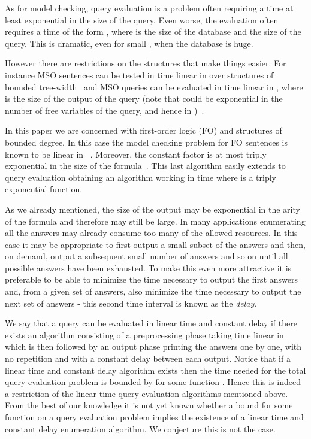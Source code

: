 \documentclass{LMCS}
\begin{document}
As for model checking, query evaluation is a problem often requiring a time at
least exponential in the size of the query. Even worse, the evaluation often
requires a time of the form , where  is the size of the database
and  the size of the query. This is dramatic, even for small , when the
database is huge.

However there are restrictions on the structures that make things easier. For
instance MSO sentences can be tested in time linear in  over structures of
bounded tree-width~\cite{Courcelle90} and MSO queries can be evaluated in time
linear in , where  is the size of the output of the query (note that
 could be exponential in the number of free variables of the query, and
hence in )~\cite{FlumFrickGrohe02}.

In this paper we are concerned with first-order logic (FO) and structures of
bounded degree. In this case the model checking problem for FO sentences is known to be
linear in ~\cite{Seese96}. Moreover, the constant factor is at most triply
exponential in the size  of the formula~\cite{FrickGrohe04}. This last
algorithm easily extends to query evaluation obtaining an algorithm working in
time  where  is a triply exponential function.

As we already mentioned, the size  of the output may be exponential in the
arity of the formula and therefore may still be large. In many applications
enumerating all the answers may already consume too many of the allowed
resources. In this case it may be appropriate to first output a small subset of
the answers and then, on demand, output a subsequent small number of answers
and so on until all possible answers have been exhausted. To make this even
more attractive it is preferable to be able to minimize the time necessary to
output the first answers and, from a given set of answers, also minimize the
time necessary to output the next set of answers - this second time interval is
known as the \emph{delay}.

We say that a query can be evaluated in linear time and constant delay if
there exists an algorithm consisting of a preprocessing phase taking time
linear in  which is then followed by an output phase printing the answers
one by one, with no repetition and with a constant delay between each output.
Notice that if a linear time and constant delay algorithm exists then the time
needed for the total query evaluation problem is bounded by  for
some function . Hence this is indeed a restriction of the linear time query
evaluation algorithms mentioned above. From the best of our knowledge it is not
yet known whether a bound  for some function  on a query evaluation
problem implies the existence of a linear time and constant delay enumeration
algorithm. We conjecture this is not the case.
\end{document}

